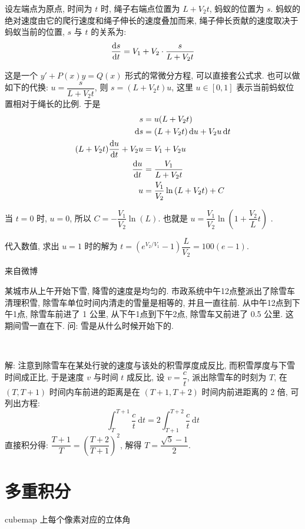 设左端点为原点, 时间为 $ t $ 时, 绳子右端点位置为 $ L + V_2 t $, 蚂蚁的位置为 $ s $. 蚂蚁的绝对速度由它的爬行速度和绳子伸长的速度叠加而来, 绳子伸长贡献的速度取决于蚂蚁当前的位置, $ s $ 与 $ t $ 的关系为:
\[
\dv{s}{t} = V_1 + V_2\cdot\frac{s}{L+V_2 t}
\]

这是一个 $ y' + P(x)y = Q(x) $ 形式的常微分方程, 可以直接套公式求. 也可以做如下的代换: $ u = \dfrac{s}{L+V_2t} $, 则 $ s = (L+V_2t)u $, 这里 $ u\in[0,1] $ 表示当前蚂蚁位置相对于绳长的比例. 于是
\begin{align*}
s &= u(L+V_2t) \\
\dd{s} &= (L+V_2t)\dd{u} + V_2u\dd{t} \\
(L+V_2t)\dv{u}{t}+V_2u &=V_1+V_2u \\
\dv{u}{t} &=\frac{V_1}{L+V_2t} \\
u &= \frac{V_1}{V_2}\ln{(L+V_2t)} + C
\end{align*}

当 $ t = 0 $ 时, $ u = 0 $, 所以 $ C = -\dfrac{V_1}{V_2}\ln(L) $. 也就是 $ u = \dfrac{V_1}{V_2}\ln{(1+\dfrac{V_2}{L}t)}$ .

代入数值, 求出 $ u = 1 $ 时的解为 $ t = \left(e^{{V_2}/{V_1}}-1\right)\dfrac{L}{V_2} = 100(e-1)$.


\newpage
\noindent 来自微博

某城市从上午开始下雪, 降雪的速度是均匀的. 市政系统中午12点整派出了除雪车清理积雪, 除雪车单位时间内清走的雪量是相等的, 并且一直往前. 从中午12点到下午1点, 除雪车前进了 1 公里, 从下午1点到下午2点, 除雪车又前进了 0.5 公里. 这期间雪一直在下. 问: 雪是从什么时候开始下的.

~

解: 注意到除雪车在某处行驶的速度与该处的积雪厚度成反比, 而积雪厚度与下雪时间成正比, 于是速度 $v$ 与时间 $t$ 成反比, 设 $v = \dfrac{c}{t}$, 派出除雪车的时刻为 $T$, 在 $(T, T+1)$ 时间内车前进的距离是在 $(T+1, T+2)$ 时间内前进距离的 2 倍, 可列出方程:
\[
\int_{T}^{T+1}{\frac{c}{t}}\ \mathrm{d}t = 2\int_{T+1}^{T+2}{\frac{c}{t}}\ \mathrm{d}t
\]
直接积分得: $\dfrac{T+1}{T} = \left(\dfrac{T+2}{T+1}\right)^2$, 解得 $T = \dfrac{\sqrt{5}-1}{2}$.

\newpage
\section{多重积分}
\noindent cubemap 上每个像素对应的立体角

